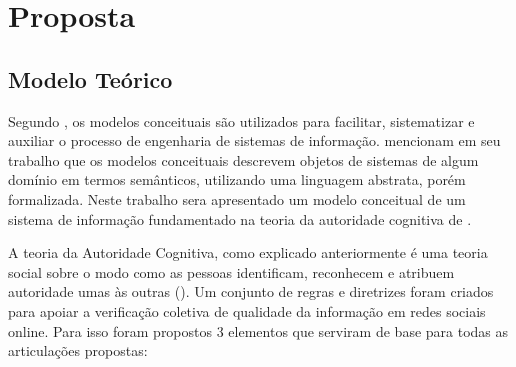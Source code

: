 \chapter{Proposta}

\section{Modelo Teórico} 

Segundo \cite{quteprints2107}, os modelos conceituais são utilizados para facilitar, sistematizar e auxiliar o processo de engenharia de sistemas de informação. \cite{wand_research_2002} mencionam em seu trabalho que os modelos conceituais descrevem objetos de sistemas de algum domínio em termos semânticos, utilizando uma linguagem abstrata, porém formalizada. Neste trabalho sera apresentado um modelo conceitual de um sistema de informação fundamentado na teoria da autoridade cognitiva de \cite{Wilson1983}.

A teoria da Autoridade Cognitiva, como explicado anteriormente é uma teoria social sobre o modo como as pessoas identificam, reconhecem e atribuem autoridade umas às outras (\cite{Wilson1983}). Um conjunto de regras e diretrizes foram criados para apoiar a verificação coletiva de qualidade da informação em redes sociais online. Para isso foram propostos 3 elementos que serviram de base para todas as articulações propostas:

